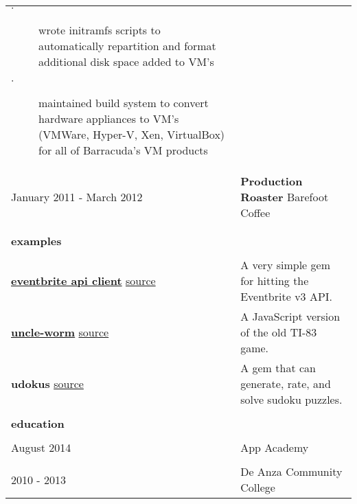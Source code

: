 \documentclass{article}
\begin{document}
\begin{tabular}{L{3cm} R{13.50cm}}
    \begin{description}
        \item[$\cdot$] wrote initramfs scripts to automatically repartition and 
            format additional disk space added to VM's
        \item[$\cdot$] maintained build system to convert hardware appliances to VM's
            (VMWare, Hyper-V, Xen, VirtualBox) for all of Barracuda's VM products
    \end{description}

    \\
    
    January 2011 - March 2012
    &
    \textbf{Production Roaster}
    Barefoot Coffee
    
    \\\\ \hline \\

    \large{\textbf{examples}} \\\\
    \normalsize
    
    \href{https://rubygems.org/gems/eventbrite_api_client}{\large{\textbf{eventbrite api client}}}
    \newline
    \normalsize
    \href{https://github.com/kellyjospehprice/eventbrite_api_client}{source}
    
    &
    
    A very simple gem for hitting the Eventbrite v3 API. 

    \\
    
    \href{http://uncle-worm.herokuapp.com}{\large{\textbf{uncle-worm}}}
    \newline
    \normalsize
    \href{https://github.com/kellyjospehprice/uncle_worm}{source}
    
    &
    
    A JavaScript version of the old TI-83 game. 

    \\
    
    {\large{\textbf{udokus}}}
    \newline
    \normalsize
    \href{https://github.com/kellyjospehprice/udokus}{source}
    
    &
    
    A gem that can generate, rate, and solve sudoku puzzles.
    
    \\ \hline \\

    \large{\textbf{education}} \\\\
    \normalsize

    August 2014 & App Academy \\

    \\

    2010 - 2013 & De Anza Community College \\
\end{tabular}
\end{document}

